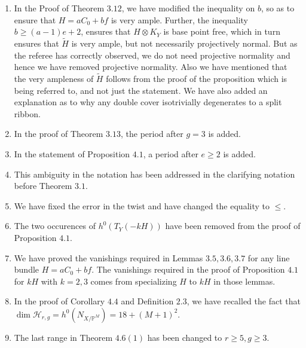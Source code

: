 \documentclass[11pt,twoside]{amsart}
\theoremstyle{plain}
\numberwithin{equation}{section}
\theoremstyle{definition}
\begin{document}
\begin{enumerate}
\item[$(30)$] In the Proof of Theorem $3.12$, we have modified the inequality on $b$, so as to ensure that $H = aC_0+bf$ is very ample. Further, the inequality $b \geq (a-1)e+2$, ensures that $H \otimes K_Y$ is base point free, which in turn ensures that $\widetilde{H}$ is very ample, but not necessarily projectively normal. But as the referee has correctly observed, we do not need projective normality and hence we have removed projective normality. Also we have mentioned that the very ampleness of $\widetilde{H}$ follows from the proof of the proposition which is being referred to, and not just the statement. We have also added an explanation as to why any double cover isotrivially degenerates to a split ribbon. 

\item[$(31)$] In the proof of Theorem $3.13$, the period after $g = 3$ is added.

\item[$(32)$] In the statement of Proposition $4.1$, a period after $e \geq 2$ is added.

\item[$(33)$] This ambiguity in the notation has been addressed in the clarifying notation before Theorem $3.1$.

\item[$(34)$] We have fixed the error in the twist and have changed the equality to $\leq$.

\item[$(35)$] The two occurences of $h^0(T_Y(-kH))$ have been removed from the proof of Proposition $4.1$.

\item[$(36)$] We have proved the vanishings required in Lemmas $3.5, 3.6, 3.7$ for any line bundle $H = aC_0+bf$. The vanishings required in the proof of Proposition $4.1$ for $kH$ with $k = 2, 3$ comes from specializing $H$ to $kH$ in those lemmas.


\item[$(37)$] In the proof of Corollary $4.4$ and Definition $2.3$, we have recalled the fact that $\operatorname{dim}\mathcal{H}_{r,g} = h^0(N_{X/\mathbb{P}^M}) =  18+(M+1)^2$.

\item[$(38)$] The last range in Theorem $4.6 (1)$ has been changed to $r \geq 5, g \geq 3$. 


\end{enumerate}
\end{document}
